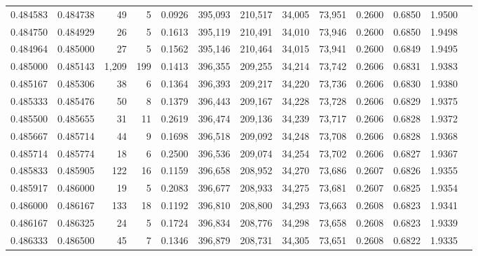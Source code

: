 \begin{tabular}{rrrrrrrrrrrrr}
0.484583 & 0.484738 &    49 &   5 &                                     0.0926 & 395,093 & 210,517 &  34,005 &  73,951 & 0.2600 & 0.6850 & 1.9500 \\
0.484750 & 0.484929 &    26 &   5 &                                     0.1613 & 395,119 & 210,491 &  34,010 &  73,946 & 0.2600 & 0.6850 & 1.9498 \\
0.484964 & 0.485000 &    27 &   5 &                                     0.1562 & 395,146 & 210,464 &  34,015 &  73,941 & 0.2600 & 0.6849 & 1.9495 \\
0.485000 & 0.485143 & 1,209 & 199 &                                     0.1413 & 396,355 & 209,255 &  34,214 &  73,742 & 0.2606 & 0.6831 & 1.9383 \\
0.485167 & 0.485306 &    38 &   6 &                                     0.1364 & 396,393 & 209,217 &  34,220 &  73,736 & 0.2606 & 0.6830 & 1.9380 \\
0.485333 & 0.485476 &    50 &   8 &                                     0.1379 & 396,443 & 209,167 &  34,228 &  73,728 & 0.2606 & 0.6829 & 1.9375 \\
0.485500 & 0.485655 &    31 &  11 &                                     0.2619 & 396,474 & 209,136 &  34,239 &  73,717 & 0.2606 & 0.6828 & 1.9372 \\
0.485667 & 0.485714 &    44 &   9 &                                     0.1698 & 396,518 & 209,092 &  34,248 &  73,708 & 0.2606 & 0.6828 & 1.9368 \\
0.485714 & 0.485774 &    18 &   6 &                                     0.2500 & 396,536 & 209,074 &  34,254 &  73,702 & 0.2606 & 0.6827 & 1.9367 \\
0.485833 & 0.485905 &   122 &  16 &                                     0.1159 & 396,658 & 208,952 &  34,270 &  73,686 & 0.2607 & 0.6826 & 1.9355 \\
0.485917 & 0.486000 &    19 &   5 &                                     0.2083 & 396,677 & 208,933 &  34,275 &  73,681 & 0.2607 & 0.6825 & 1.9354 \\
0.486000 & 0.486167 &   133 &  18 &                                     0.1192 & 396,810 & 208,800 &  34,293 &  73,663 & 0.2608 & 0.6823 & 1.9341 \\
0.486167 & 0.486325 &    24 &   5 &                                     0.1724 & 396,834 & 208,776 &  34,298 &  73,658 & 0.2608 & 0.6823 & 1.9339 \\
0.486333 & 0.486500 &    45 &   7 &                                     0.1346 & 396,879 & 208,731 &  34,305 &  73,651 & 0.2608 & 0.6822 & 1.9335 \\

\end{tabular}
